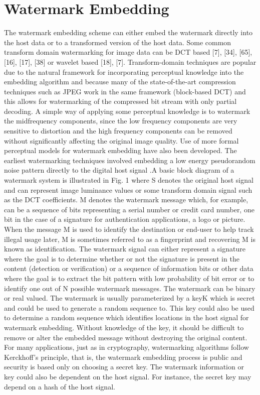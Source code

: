 \documentclass[12pt]{IEeetran}
\begin{document}
\section{Watermark Embedding}
The watermark embedding scheme can either embed the
watermark directly into the host data or to a transformed
version of the host data. Some common transform domain watermarking for image data can be DCT based [7],
[34], [65], [16], [17], [38] or wavelet based [18], [7].
Transform-domain techniques are popular due to the
natural framework for incorporating perceptual knowledge into the embedding algorithm and because many of
the state-of-the-art compression techniques such as JPEG
work in the same framework (block-based DCT) and this
allows for watermarking of the compressed bit stream
with only partial decoding. A simple way of applying
some perceptual knowledge is to watermark the
midfrequency components, since the low frequency components are very sensitive to distortion and the high frequency components can be removed without significantly affecting the original image quality. Use of more formal perceptual models for watermark embedding have also been developed. The earliest watermarking techniques involved embedding a low energy pseudorandom noise pattern directly to the digital host signal .A basic block diagram of a watermark system is illustrated in Fig. 1 where S denotes the original host signal
and can represent image luminance values or some transform domain signal such as the DCT coefficients. M denotes the watermark message which, for example, can be a sequence of bits representing a serial number or credit card number, one bit in the case of a signature for authentication applications, a logo or picture. When the message M is used to identify the destination or end-user to help track illegal usage later, M is sometimes referred to as a
fingerprint and recovering M is known as identification.
The watermark signal can either represent a signature
where the goal is to determine whether or not the signature is present in the content (detection or verification) or a
sequence of information bits or other data where the goal
is to extract the bit pattern with low probability of bit error or to identify one out of N possible watermark messages. The watermark can be binary or real valued. The
watermark is usually parameterized by a keyK which is secret and could be used to generate a random sequence to. This key could also be used to determine a random sequence which identifies locations in the host signal for watermark embedding. Without knowledge of the key, it should be difficult to remove or alter the embedded message without destroying the original content.
For many applications, just as in cryptography,
watermarking algorithms follow Kerckhoff’s principle,
that is, the watermark embedding process is public and
security is based only on choosing a secret key. The watermark information or key could also be dependent on the
host signal. For instance, the secret key may depend on a
hash of the host signal.
\end{document}
